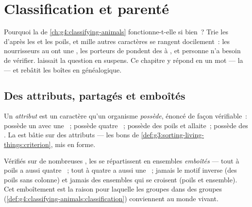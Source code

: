 \chapter{Classification et parenté}\label{ch:g6:classification-kinship}

Pourquoi la  de
\cref{ch:g4:classifying-animals} fonctionne-t-elle si bien~? Trie
les  d'après les  et les poils, et mille autres
caractères se rangent docilement~: les nourrisseurs au  ont une
, les porteurs de  pondent des  à
, et personne n'a besoin de vérifier.
 laissait la question en
suspens. Ce chapitre y répond en un mot --- la  --- et
rebâtit les boîtes en  généalogique.

\section{Des attributs, partagés et emboîtés}

\begin{definition}[Attribut]\label{def:g6:classification-kinship:attribute}
Un \emph{attribut} est un caractère qu'un organisme
\emph{possède}, énoncé de façon vérifiable~: possède un 
avec une ~; possède quatre ~; possède des
poils et allaite~; possède des . La  est bâtie
sur des attributs --- les bons  de
\cref{def:g3:sorting-living-things:criterion}, mis en forme.
\end{definition}

\begin{proposition}\label{prop:g6:classification-kinship:nest}
Vérifiés sur de nombreuses , les  se répartissent en
ensembles \emph{emboîtés} --- tout  à poils a aussi quatre
~; tout  à quatre  a aussi une ~; jamais le motif inverse (des poils sans colonne) et
jamais des ensembles qui se croisent (poils et  ensemble). Cet
emboîtement est la raison pour laquelle les groupes dans des groupes
(\cref{def:g4:classifying-animals:classification}) conviennent au
monde vivant.
\end{proposition}
\admitted

